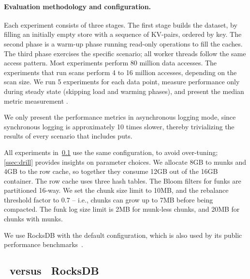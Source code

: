 \paragraph{Evaluation methodology and configuration.} Each experiment consists of three stages. The first stage builds 
the dataset, by filling an initially empty store with a sequence of KV-pairs, ordered by key. The second phase is a warm-up phase running read-only operations to fill the caches. The third
phase exercises the specific scenario; all worker threads follow the same access pattern. Most experiments 
perform 80 million data accesses. The experiments that run scans perform 4 to 16 million accesses, depending 
on the scan size. We run 5 experiments for each data point, measure performance only during steady state (skipping load and warming phases), and present the median metric measurement %
.

We only present the performance metrics in asynchronous logging mode, since synchronous logging 
is approximately 10 times slower, thereby trivializing the results of every scenario that includes puts. 

All experiments in~\cref{ssec:results} use the same \sys\/ configuration, to avoid 
over-tuning; \cref{ssec:drill} provides insights on parameter choices.
We allocate 8GB to munks and 4GB to the row cache,
so together they consume 12GB out of the 16GB container. 
The row cache uses three hash tables.  
The Bloom filters for funks are partitioned 16-way.  
We set the \sys\/ chunk size limit to 10MB, and the rebalance threshold factor to $0.7$ -- i.e., 
chunks can grow up to 7MB  %
before being compacted. The funk log size limit is 2MB for munk-less chunks, 
and 20MB for chunks with munks. 

We use RocksDB with the default configuration, which is also used by its public performance benchmarks~\cite{RocksDBPerf}.

\subsection{\sys\ versus \ RocksDB}
\label{ssec:results} 

